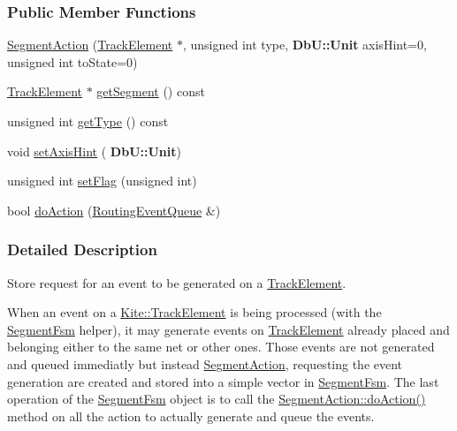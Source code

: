 \subsubsection*{Public Member Functions}
\begin{DoxyCompactItemize}
\item 
\mbox{\hyperlink{classKite_1_1SegmentAction_acbeca58f8327b69a540628f299d5bd35}{Segment\+Action}} (\mbox{\hyperlink{classKite_1_1TrackElement}{Track\+Element}} $\ast$, unsigned int type, \textbf{ Db\+U\+::\+Unit} axis\+Hint=0, unsigned int to\+State=0)
\item 
\mbox{\hyperlink{classKite_1_1TrackElement}{Track\+Element}} $\ast$ \mbox{\hyperlink{classKite_1_1SegmentAction_a506a4d1cef59fc35984c1c88e0c0f6df}{get\+Segment}} () const
\item 
unsigned int \mbox{\hyperlink{classKite_1_1SegmentAction_a093e88be27fab140cca8ec652beab529}{get\+Type}} () const
\item 
void \mbox{\hyperlink{classKite_1_1SegmentAction_a8dc7cdf5f643a856fa5208bcfd1f8342}{set\+Axis\+Hint}} (\textbf{ Db\+U\+::\+Unit})
\item 
unsigned int \mbox{\hyperlink{classKite_1_1SegmentAction_a4e1f44319a9a0a413fe1413a87ec78bd}{set\+Flag}} (unsigned int)
\item 
bool \mbox{\hyperlink{classKite_1_1SegmentAction_a324f17f0f5a09b76344eb2e003695d74}{do\+Action}} (\mbox{\hyperlink{classKite_1_1RoutingEventQueue}{Routing\+Event\+Queue}} \&)
\end{DoxyCompactItemize}


\subsubsection{Detailed Description}
Store request for an event to be generated on a \mbox{\hyperlink{classKite_1_1TrackElement}{Track\+Element}}. 

When an event on a \mbox{\hyperlink{classKite_1_1TrackElement}{Kite\+::\+Track\+Element}} is being processed (with the \mbox{\hyperlink{classKite_1_1SegmentFsm}{Segment\+Fsm}} helper), it may generate events on \mbox{\hyperlink{classKite_1_1TrackElement}{Track\+Element}} already placed and belonging either to the same net or other ones. Those events are not generated and queued immediatly but instead \mbox{\hyperlink{classKite_1_1SegmentAction}{Segment\+Action}}, requesting the event generation are created and stored into a simple vector in \mbox{\hyperlink{classKite_1_1SegmentFsm}{Segment\+Fsm}}. The last operation of the \mbox{\hyperlink{classKite_1_1SegmentFsm}{Segment\+Fsm}} object is to call the \mbox{\hyperlink{classKite_1_1SegmentAction_a324f17f0f5a09b76344eb2e003695d74}{Segment\+Action\+::do\+Action()}} method on all the action to actually generate and queue the events. 

